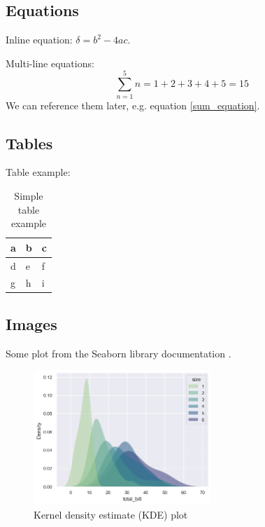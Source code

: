 \documentclass{pwrReport} %
\begin{document}
    \subsection{Equations}
        Inline equation: $\delta=b^2-4ac$.

        \noindent Multi-line equations:
        \begin{equation}
            \sum_{n=1}^{5} n = 1+2+3+4+5=15
            \label{sum_equation}
        \end{equation}
        \noindent We can reference them later, e.g. equation \ref{sum_equation}.

    \subsection{Tables}
        Table example:
        \begin{table}[h]
            \centering
            \begin{tabular}{|l|l|l|}
                \hline
                a & b & c \\ \hline
                d & e & f \\ \hline
                g & h & i \\ \hline
            \end{tabular}
            \caption{Simple table example}
        \end{table}

    \newpage
    \subsection{Images}
        Some plot from the Seaborn library documentation \cite{Waskom2021}.
        \begin{figure}[!htbp]%
            \centering
            \includegraphics[width=0.6\textwidth]{images/kdeplot.png}
            \caption{Kernel density estimate (KDE) plot }%
            \label{fig:wust_logo}
        \end{figure}
\end{document}
